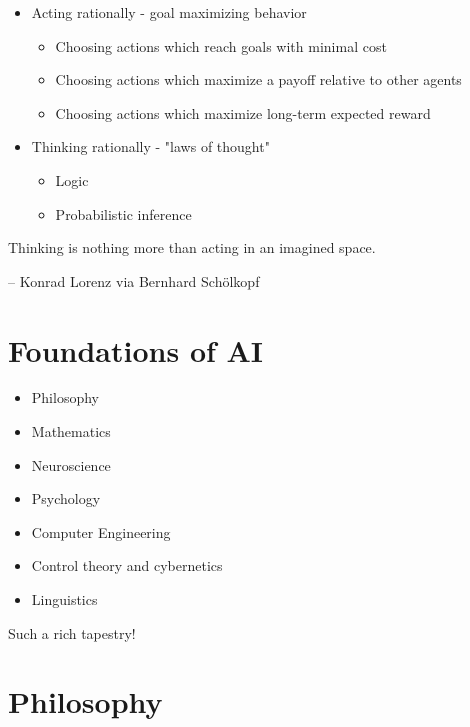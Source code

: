 \documentclass[11pt]{article}
\renewenvironment{quote}{\begin{shaded*}\begin{oldquote}}{\end{oldquote}\end{shaded*}}
\begin{document}
\begin{itemize}
\item Acting rationally - goal maximizing behavior

\begin{itemize}
\item Choosing actions which reach goals with minimal cost
\item Choosing actions which maximize a payoff relative to other agents
\item Choosing actions which maximize long-term expected reward
\end{itemize}

\item Thinking rationally - "laws of thought"

\begin{itemize}
\item Logic
\item Probabilistic inference
\end{itemize}
\end{itemize}


\begin{quote}
Thinking is nothing more than acting in an imagined space.
\end{quote}
\begin{quote}

\end{quote}
\begin{quote}
-- Konrad Lorenz via Bernhard Schölkopf
\end{quote}
\section{Foundations of AI}
\label{sec:org9938c3f}

\begin{itemize}
\item Philosophy
\item Mathematics
\item Neuroscience
\item Psychology
\item Computer Engineering
\item Control theory and cybernetics
\item Linguistics
\end{itemize}

Such a rich tapestry!
\section{Philosophy}
\label{sec:org0672545}
\end{document}
